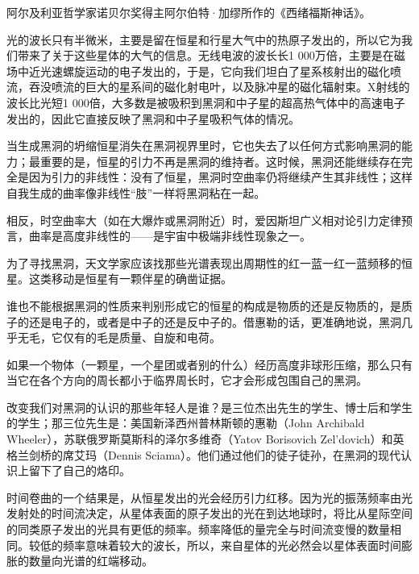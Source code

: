 \begin{itemize*}
	\item 阿尔及利亚哲学家诺贝尔奖得主阿尔伯特·加缪所作的《西绪福斯神话》。
	\item 光的波长只有半微米，主要是留在恒星和行星大气中的热原子发出的，所以它为我们带来了关于这些星体的大气的信息。无线电波的波长长1 000万倍，主要是在磁场中近光速螺旋运动的电子发出的，于是，它向我们坦白了星系核射出的磁化喷流，吞没喷流的巨大的星系间的磁化射电叶，以及脉冲星的磁化辐射束。X射线的波长比光短1 000倍，大多数是被吸积到黑洞和中子星的超高热气体中的高速电子发出的，因此它直接反映了黑洞和中子星吸积气体的情况。
	\item 当生成黑洞的坍缩恒星消失在黑洞视界里时，它也失去了以任何方式影响黑洞的能力；最重要的是，恒星的引力不再是黑洞的维持者。这时候，黑洞还能继续存在完全是因为引力的非线性：没有了恒星，黑洞时空曲率仍将继续产生其非线性；这样自我生成的曲率像非线性“肢”一样将黑洞粘在一起。
	\item 相反，时空曲率大（如在大爆炸或黑洞附近）时，爱因斯坦广义相对论引力定律预言，曲率是高度非线性的——是宇宙中极端非线性现象之一。
	\item 为了寻找黑洞，天文学家应该找那些光谱表现出周期性的红一蓝一红一蓝频移的恒星。这类移动是恒星有一颗伴星的确凿证据。
	\item 谁也不能根据黑洞的性质来判别形成它的恒星的构成是物质的还是反物质的，是质子的还是电子的，或者是中子的还是反中子的。借惠勒的话，更准确地说，黑洞几乎无毛，它仅有的毛是质量、自旋和电荷。
	\item 如果一个物体（一颗星，一个星团或者别的什么）经历高度非球形压缩，那么只有当它在各个方向的周长都小于临界周长时，它才会形成包围自己的黑洞。
	\item 改变我们对黑洞的认识的那些年轻人是谁？是三位杰出先生的学生、博士后和学生的学生；那三位先生是：美国新泽西州普林斯顿的惠勒（John Archibald Wheeler），苏联俄罗斯莫斯科的泽尔多维奇（Yatov Borisovich Zel'dovich）和英格兰剑桥的席艾玛（Dennis Sciama）。他们通过他们的徒子徒孙，在黑洞的现代认识上留下了自己的烙印。
	\item 时间卷曲的一个结果是，从恒星发出的光会经历引力红移。因为光的振荡频率由光发射处的时间流决定，从星体表面的原子发出的光在到达地球时，将比从星际空间的同类原子发出的光具有更低的频率。频率降低的量完全与时间流变慢的数量相同。较低的频率意味着较大的波长，所以，来自星体的光必然会以星体表面时间膨胀的数量向光谱的红端移动。
\end{itemize*}
